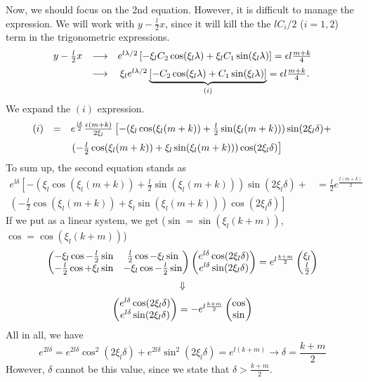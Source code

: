 \documentclass[a4paper,preprint,11pt]{article}
\begin{document}
Now, we should focus on the 2nd equation. However, it is difficult to manage the expression. We will work with $y-\frac{l}{2}x$, since it will kill the the $lC_i/2$ ($i=1,2$) term in the trigonometric expressions.
$$
\begin{array}{ccc}
y-\frac{l}{2}x & \longrightarrow & e^{l\lambda/2}\left[-\xi_lC_2\cos(\xi_l\lambda) + \xi_lC_1\sin(\xi_l\lambda) \right] = \epsilon l\frac{m+k}{4} \vspace{0.2cm}\\
& \longrightarrow &  \xi_l e^{l\lambda/2}\underbrace{\left[-C_2\cos(\xi_l\lambda) + C_1\sin(\xi_l\lambda) \right]}_{(i)} = \epsilon l\frac{m+k}{4}.
\end{array}
$$
We expand the $(i)$ expression.
$$
\begin{array}{lll}
(i) & = & e^{\frac{l\delta}{2}}\frac{\epsilon(m+k)}{2\xi_l}
\left[
-(\xi_l\cos(\xi_l(m+k))+\frac{l}{2}\sin(\xi_l(m+k)))\sin(2\xi_l\delta) + \right. \vspace{0.2cm}\\
& & \left. (-\frac{l}{2}\cos(\xi_l(m+k))+\xi_l\sin(\xi_l(m+k)))\cos(2\xi_l\delta)
\right]
\end{array}
$$
To sum up, the second equation stands as
$$
\begin{array}{rl}
e^{l\delta}\left[
-(\xi_l\cos(\xi_l(m+k))+\frac{l}{2}\sin(\xi_l(m+k)))\sin(2\xi_l\delta) + \right. 
& = \frac{l}{2}e^{\frac{l(m+k)}{2}}
\\
\left. (-\frac{l}{2}\cos(\xi_l(m+k))+\xi_l\sin(\xi_l(m+k)))\cos(2\xi_l\delta)
\right]
\end{array}
$$
If we put as a linear system, we get ($\sin=\sin(\xi_l(k+m))$, $\cos=\cos(\xi_l(k+m))$)
$$
\begin{array}{c}
\begin{pmatrix}
-\xi_l\cos-\frac{l}{2}\sin & \frac{l}{2}\cos-\xi_l\sin \\ -\frac{l}{2}\cos+\xi_l\sin & -\xi_l\cos-\frac{l}{2}\sin
\end{pmatrix}
\begin{pmatrix}
e^{l\delta}\cos(2\xi_l\delta) \\ e^{l\delta}\sin(2\xi_l\delta) 
\end{pmatrix}
=
e^{l\frac{k+m}{2}}
\begin{pmatrix}
\xi_l \\ \frac{l}{2}
\end{pmatrix} \vspace{0.2cm} \\
\Downarrow \vspace{0.2cm} \\
\begin{pmatrix}
e^{l\delta}\cos(2\xi_l\delta) \\ e^{l\delta}\sin(2\xi_l\delta) 
\end{pmatrix}
=
-e^{l\frac{k+m}{2}}
\begin{pmatrix}
\cos \\ \sin
\end{pmatrix}
\end{array}
$$
All in all, we have
$$
e^{2l\delta} = e^{2l\delta}\cos^2(2\xi_l\delta)+e^{2l\delta}\sin^2(2\xi_l\delta) = e^{l(k+m)} \longrightarrow \boxed{\delta = \frac{k+m}{2}}
$$
However, $\delta$ cannot be this value, since we state that $\delta>\frac{k+m}{2}$.
\end{document}
